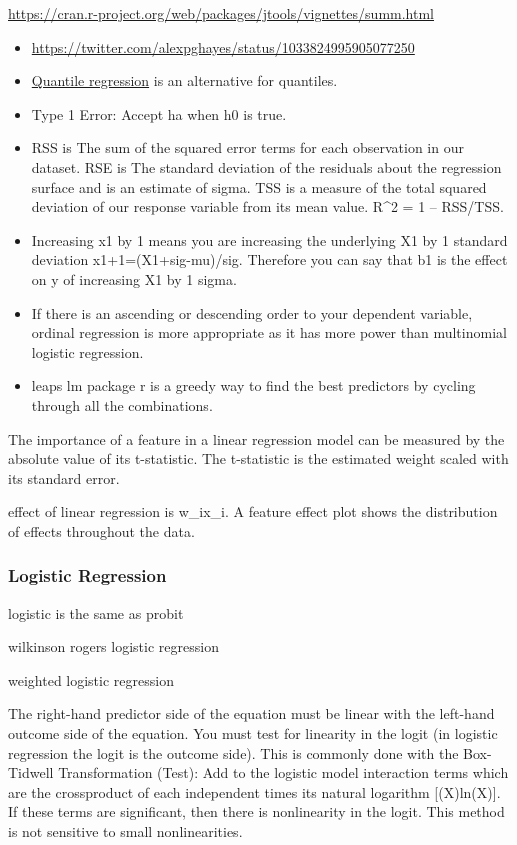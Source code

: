 \documentclass[]{book}
\begin{document}
\url{https://cran.r-project.org/web/packages/jtools/vignettes/summ.html}

\begin{itemize}
\item
  \url{https://twitter.com/alexpghayes/status/1033824995905077250}
\item
  \href{https://en.wikipedia.org/wiki/Quantile_regression}{Quantile regression} is an alternative for quantiles.
\item
  Type 1 Error: Accept ha when h0 is true.
\item
  RSS is The sum of the squared error terms for each observation in our dataset. RSE is The standard deviation of the residuals about the regression surface and is an estimate of sigma. TSS is a measure of the total squared deviation of our response variable from its mean value. R\^{}2 = 1 -- RSS/TSS.
\item
  Increasing x1 by 1 means you are increasing the underlying X1 by 1 standard deviation x1+1=(X1+sig-mu)/sig. Therefore you can say that b1 is the effect on y of increasing X1 by 1 sigma.
\item
  If there is an ascending or descending order to your dependent variable, ordinal regression is more appropriate as it has more power than multinomial logistic regression.
\item
  leaps lm package r is a greedy way to find the best predictors by cycling through all the combinations.
\end{itemize}

The importance of a feature in a linear regression model can be measured by the absolute value of
its t-statistic. The t-statistic is the estimated weight scaled with its standard error.

effect of linear regression is w\_ix\_i. A feature effect plot shows the distribution of effects throughout the data.

\hypertarget{logistic-regression}{%
\subsubsection{Logistic Regression}\label{logistic-regression}}

logistic is the same as probit

wilkinson rogers logistic regression

weighted logistic regression

The right-hand predictor side of the equation must be linear with the left-hand outcome side of the equation. You must test for linearity in the logit (in logistic regression the logit is the outcome side). This is commonly done with the Box-Tidwell Transformation (Test): Add to the logistic model interaction terms which are the crossproduct of each independent times its natural logarithm {[}(X)ln(X){]}. If these terms are significant, then there is nonlinearity in the logit. This method is not sensitive to small nonlinearities.
\end{document}
